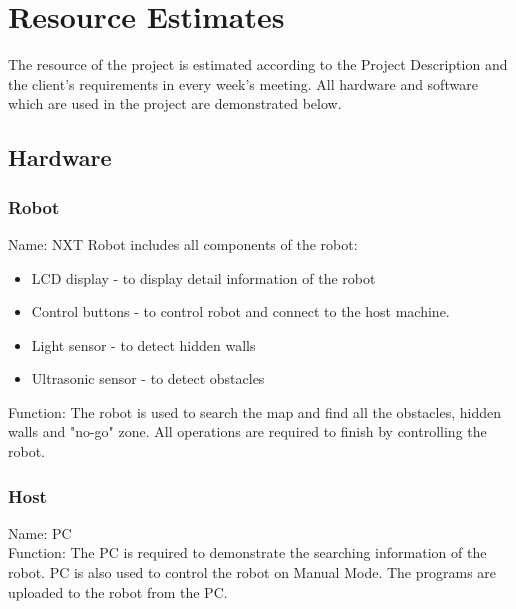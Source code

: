 \documentclass[11pt, a4paper]{report}
\begin{document}


\pagebreak




\chapter{Resource Estimates} %
\label{cha:RE}
The resource of the project is estimated according to the Project Description and the client's requirements in every week's meeting. All hardware and software which are used in the project are demonstrated below.
\section{Hardware}
\subsection{Robot}
Name: NXT Robot includes all components of the robot:
\begin{itemize}
\item LCD display - to display detail information of the robot
\item Control buttons - to control  robot and connect to the host machine.
\item Light sensor - to detect hidden walls
\item Ultrasonic sensor - to detect obstacles
\end{itemize}
Function: The robot is used to search the map and find all the obstacles, hidden walls and "no-go" zone. All operations are required to finish by controlling the robot.
\subsection{Host}
Name: PC\\
Function: The PC is required to demonstrate the searching information of the robot. PC is also used to control the robot on Manual Mode. The programs are uploaded to the robot from the PC.
\end{document}
